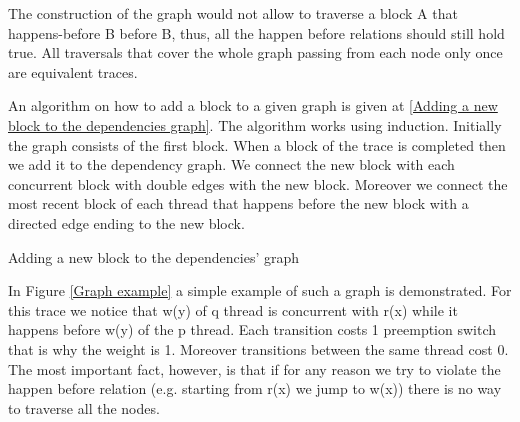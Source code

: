 The construction of the graph would not allow to traverse a block A that happens-before B before B, thus, all the happen before relations should still hold true.
All traversals that cover the whole graph passing from each node only once are equivalent traces.

\noindent An algorithm on how to add a block to a given graph is given at \ref{Adding a new block to the dependencies graph}. The algorithm works using induction.
Initially the graph consists of the first block. When a block of the trace is completed then we add it to the dependency graph. We connect the new block with each 
concurrent block with double edges with the new block. Moreover we connect the most recent block of each thread that happens before the new block with a directed edge
ending to the new block. 

\begin{algorithm}[H]
    \caption{Adding a new block to the dependencies' graph}
    \label{Adding a new block to the dependencies graph}
\end{algorithm}



In Figure \ref{Graph example} a simple example of such a graph is demonstrated. For this trace we notice that w(y) of q thread is concurrent with r(x) while 
it happens before w(y) of the p thread. Each transition costs 1 preemption switch that is why the weight is 1. Moreover transitions between the same thread cost 0.
The most important fact, however, is that if for any reason we try to violate the happen before relation (e.g. starting from r(x) we jump to w(x)) there is no way to 
traverse all the nodes. 

